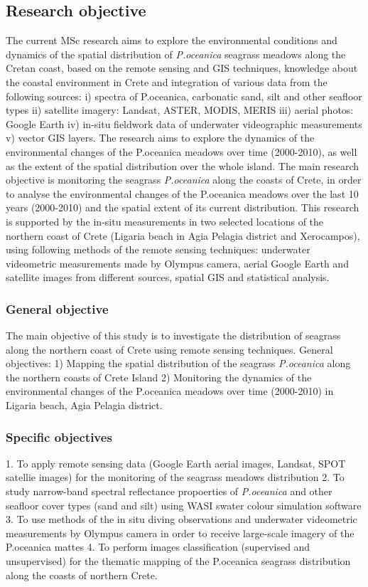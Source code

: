 \documentclass[10pt, a4paper]{article}
\begin{document}
\subsection{Research objective}
The current MSc research aims to explore the environmental conditions and dynamics of the spatial
distribution of \textit{P.oceanica} seagrass meadows along the Cretan coast, based on the remote sensing and
GIS techniques, knowledge about the coastal environment in Crete and integration of various data
from the following sources:
i) spectra of P.oceanica, carbonatic sand, silt and other seafloor types
ii) satellite imagery: Landsat, ASTER, MODIS, MERIS
iii) aerial photos: Google Earth
iv) in-situ fieldwork data of underwater videographic measurements
v) vector GIS layers.
The research aims to explore the dynamics of the environmental changes of the P.oceanica meadows
over time (2000-2010), as well as the extent of the spatial distribution over the whole island. The
main research objective is monitoring the seagrass \textit{P.oceanica} along the coasts of Crete, in order to
analyse the environmental changes of the P.oceanica meadows over the last 10 years (2000-2010)
and the spatial extent of its current distribution.
This research is supported by the in-situ measurements in two selected locations of the northern coast
of Crete (Ligaria beach in Agia Pelagia district and Xerocampos), using following methods of the
remote sensing techniques: underwater videometric measurements made by Olympus camera, aerial
Google Earth and satellite images from different sources, spatial GIS and statistical analysis.

\subsubsection{General objective}
The main objective of this study is to investigate the distribution of seagrass along the northern coast
of Crete using remote sensing techniques.
General objectives:
1) Mapping the spatial distribution of the seagrass \textit{P.oceanica} along the northern coasts of
Crete Island
2) Monitoring the dynamics of the environmental changes of the P.oceanica meadows over
time (2000-2010) in Ligaria beach, Agia Pelagia district.

\subsubsection{Specific objectives}
1. To apply remote sensing data (Google Earth aerial images, Landsat, SPOT satellie images)
for the monitoring of the seagrass meadows distribution
2. To study narrow-band spectral reflectance propoerties of \textit{P.oceanica} and other seafloor
cover types (sand and silt) using WASI swater colour simulation software
3. To use methods of the in situ diving observations and underwater videometric measurements
by Olympus camera in order to receive large-scale imagery of the P.oceanica mattes
4. To perform images classification (supervised and unsupervised) for the thematic mapping of
the P.oceanica seagrass distribution along the coasts of northern Crete.
\end{document}
